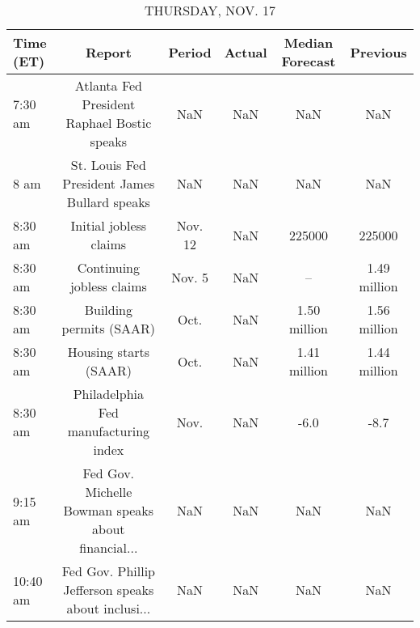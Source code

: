 \documentclass{article}%
\begin{document}
\begin{table}[htbp]%
\caption{THURSDAY, NOV. 17}%
\centering%
\begin{adjustbox}{width=1\textwidth}%
\begin{tabular}{lccccc}
\toprule
Time (ET) &                                             Report &  Period & Actual & Median Forecast &     Previous \\
\midrule
  7:30 am &        Atlanta Fed President Raphael Bostic speaks &     NaN &    NaN &             NaN &          NaN \\
     8 am &       St. Louis Fed President James Bullard speaks &     NaN &    NaN &             NaN &          NaN \\
  8:30 am &                             Initial jobless claims & Nov. 12 &    NaN &          225000 &       225000 \\
  8:30 am &                          Continuing jobless claims &  Nov. 5 &    NaN &              -- & 1.49 million \\
  8:30 am &                            Building permits (SAAR) &    Oct. &    NaN &    1.50 million & 1.56 million \\
  8:30 am &                              Housing starts (SAAR) &    Oct. &    NaN &    1.41 million & 1.44 million \\
  8:30 am &               Philadelphia Fed manufacturing index &    Nov. &    NaN &            -6.0 &         -8.7 \\
  9:15 am & Fed Gov. Michelle Bowman speaks about financial... &     NaN &    NaN &             NaN &          NaN \\
 10:40 am & Fed Gov. Phillip Jefferson speaks about inclusi... &     NaN &    NaN &             NaN &          NaN \\
\bottomrule
\end{tabular}
%
\end{adjustbox}%
\end{table}

%
\end{document}

